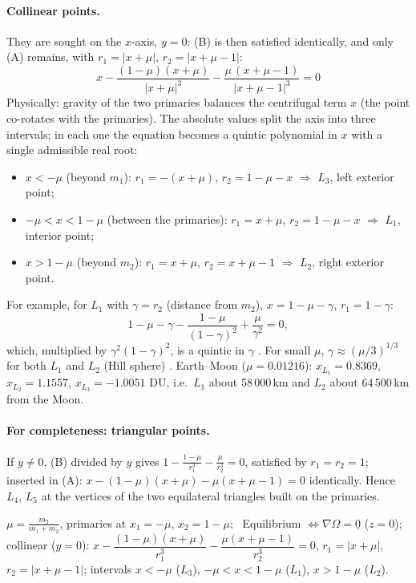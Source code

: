 \paragraph{Collinear points.} They are sought on the $x$-axis, $y=0$: (B) is then satisfied identically, and only (A) remains,
with $r_1=|x+\mu|$, $r_2=|x+\mu-1|$:
\begin{equation}
\boxed{\;x-\frac{(1-\mu)(x+\mu)}{|x+\mu|^{3}}-\frac{\mu\,(x+\mu-1)}{|x+\mu-1|^{3}}=0\;}
\end{equation}
Physically: gravity of the two primaries balances the centrifugal term $x$ (the point co-rotates with the primaries). The
absolute values split the axis into three intervals; in each one the equation becomes a quintic polynomial in $x$ with a single
admissible real root:
\begin{itemize}
\item[(a)] $x<-\mu$ (beyond $m_1$): $r_1=-(x+\mu)$, $r_2=1-\mu-x$ $\Rightarrow$ \textbf{$L_3$}, left exterior point;
\item[(b)] $-\mu<x<1-\mu$ (between the primaries): $r_1=x+\mu$, $r_2=1-\mu-x$ $\Rightarrow$ \textbf{$L_1$}, interior point;
\item[(c)] $x>1-\mu$ (beyond $m_2$): $r_1=x+\mu$, $r_2=x+\mu-1$ $\Rightarrow$ \textbf{$L_2$}, right exterior point.
\end{itemize}
For example, for $L_1$ with $\gamma=r_2$ (distance from $m_2$), $x=1-\mu-\gamma$, $r_1=1-\gamma$:
\begin{equation}
1-\mu-\gamma-\frac{1-\mu}{(1-\gamma)^2}+\frac{\mu}{\gamma^2}=0,
\end{equation}
which, multiplied by $\gamma^2(1-\gamma)^2$, is a quintic in $\gamma$ \notinnotes. For small $\mu$, $\gamma\approx(\mu/3)^{1/3}$ for both
$L_1$ and $L_2$ (Hill sphere) \notinnotes. Earth--Moon ($\mu=0.01216$): $x_{L_1}=0.8369$, $x_{L_2}=1.1557$, $x_{L_3}=-1.0051$ DU,
i.e.\ $L_1$ about 58\,000\,km and $L_2$ about 64\,500\,km from the Moon.

\paragraph{For completeness: triangular points.} If $y\neq0$, (B) divided by $y$ gives $1-\frac{1-\mu}{r_1^3}-\frac{\mu}{r_2^3}=0$, satisfied by
$r_1=r_2=1$; inserted in (A): $x-(1-\mu)(x+\mu)-\mu(x+\mu-1)=0$ identically. Hence $L_4$, $L_5$ at the vertices of the two
equilateral triangles built on the primaries.

\begin{keyf}
$\mu=\frac{m_2}{m_1+m_2}$, primaries at $x_1=-\mu$, $x_2=1-\mu$; \
Equilibrium $\Leftrightarrow\nabla\Omega=\underline 0$ ($z=0$); collinear ($y=0$): $x-\dfrac{(1-\mu)(x+\mu)}{r_1^3}-\dfrac{\mu(x+\mu-1)}{r_2^3}=0$,
$r_1=|x+\mu|$, $r_2=|x+\mu-1|$; intervals $x<-\mu$ ($L_3$), $-\mu<x<1-\mu$ ($L_1$), $x>1-\mu$ ($L_2$).
\end{keyf}

